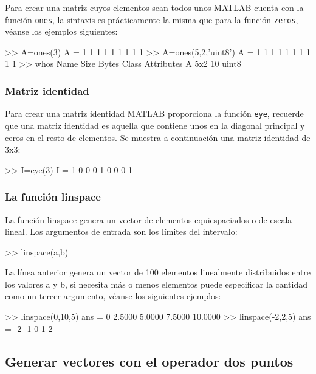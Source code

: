 Para crear una matriz cuyos elementos sean todos unos MATLAB cuenta con
la función \texttt{ones}, la sintaxis es prácticamente la misma que para
la función \texttt{zeros}, véanse los ejemplos siguientes:

\begin{matlab}
>> A=ones(3)
A =
     1     1     1
     1     1     1
     1     1     1
>> A=ones(5,2,'uint8')
A =
    1    1
    1    1
    1    1
    1    1
    1    1
>> whos
  Name      Size            Bytes  Class    Attributes
  A         5x2                10  uint8      
\end{matlab}

\subsubsection{Matriz identidad}\label{matriz-identidad}

Para crear una matriz identidad MATLAB proporciona la función
\texttt{eye}, recuerde que una matriz identidad es aquella que contiene
unos en la diagonal principal y ceros en el resto de elementos. Se
muestra a continuación una matriz identidad de 3x3:

\begin{matlab}
>> I=eye(3)
I =
     1     0     0
     0     1     0
     0     0     1
\end{matlab}

\subsubsection{La función linspace}\label{la-funcion-linspace}

La función linspace genera un vector de elementos equiespaciados o de
escala lineal. Los argumentos de entrada son los límites del intervalo:

\begin{matlab}
>> linspace(a,b)
\end{matlab}

La línea anterior genera un vector de 100 elementos linealmente
distribuidos entre los valores a y b, si necesita más o menos elementos
puede especificar la cantidad como un tercer argumento, véanse los
siguientes ejemplos:

\begin{matlab}
>> linspace(0,10,5)
ans =
         0    2.5000    5.0000    7.5000   10.0000
>> linspace(-2,2,5)
ans =
    -2    -1     0     1     2
\end{matlab}

\subsection{Generar vectores con el operador dos puntos}\label{generar-vectores-con-el-operador-dos-puntos}

